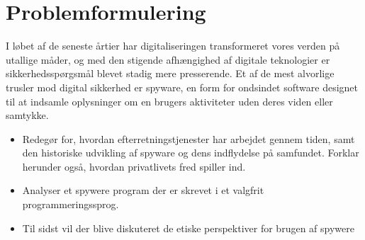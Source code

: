 \section{Problemformulering}\label{sec:Problemformulering}
I løbet af de seneste årtier har digitaliseringen transformeret vores verden på utallige måder, og med den stigende afhængighed af digitale teknologier er sikkerhedsspørgsmål blevet stadig mere presserende. Et af de mest alvorlige trusler mod digital sikkerhed er spyware, en form for ondsindet software designet til at indsamle oplysninger om en brugers aktiviteter uden deres viden eller samtykke. 
\begin{itemize}
    \item Redegør for, hvordan efterretningstjenester har arbejdet gennem tiden, samt den historiske udvikling af spyware og dens indflydelse på samfundet. Forklar herunder også, hvordan privatlivets fred spiller ind. %
    
    \item Analyser et spywere program der er skrevet i et valgfrit programmeringssprog.
    
    \item Til sidst vil der blive diskuteret de etiske perspektiver for brugen af spywere
\end{itemize}
\newpage